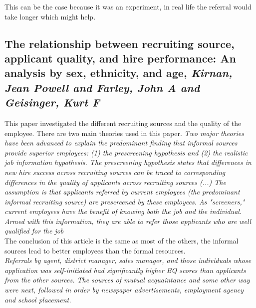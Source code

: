 \documentclass[a4paper, 11pt]{article} %
\begin{document}
This can be the case because it was an experiment, in real life the referral would take longer which might help.


\subsection*{The relationship between recruiting source, applicant quality, and hire performance: An analysis by sex, ethnicity, and age, 
\emph{Kirnan, Jean Powell and Farley, John A and Geisinger, Kurt F} \cite{tenth}}

This paper investigated the different recruiting sources and the quality of the employee. There are two main theories used in this paper. \emph{Two major theories have been advanced to explain the predominant
finding that informal sources provide superior employees: (1) the prescreening hypothesis and (2) the realistic job information hypothesis. The
prescreening hypothesis states that differences in new hire success across
recruiting sources can be traced to corresponding differences in the quality
of applicants across recruiting sources (...) The assumption is that applicants referred by current employees (the predominant informal recruiting source) are prescreened by these
employees. As "screeners," current employees have the benefit of knowing
both the job and the individual. Armed with this information, they are able
to refer those applicants who are well qualified for the job}\\

The conclusion of this article is the same as most of the others, the informal sources lead to better employees than the formal resources.\\

\emph{Referrals by agent, district manager, sales manager,
and those individuals whose application was self-initiated had significantly
higher BQ scores than applicants from the other sources. The sources
of mutual acquaintance and some other way were next, followed in order
by newspaper advertisements, employment agency and school placement.}\\
\end{document}
